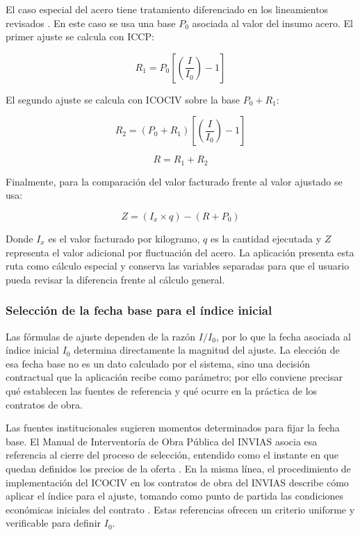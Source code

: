 \documentclass[12pt,letterpaper]{article}
\providecommand{\parencite}{\citep}
\newcommand{\ICOCIV}{ICOCIV}
\newcommand{\ICCP}{ICCP}
\newcommand{\INVIAS}{INVIAS}
\begin{document}
El caso especial del acero tiene tratamiento diferenciado en los lineamientos revisados \parencite{idu_circular_6_2022}. En este caso se usa una base \(P_0\) asociada al valor del insumo acero. El primer ajuste se calcula con \ICCP:

\begin{equation}
\label{eq:r1_acero}
R_1 = P_0 \left[ \left( \frac{I}{I_0} \right) - 1 \right]
\end{equation}

El segundo ajuste se calcula con \ICOCIV{} sobre la base \(P_0 + R_1\):

\begin{equation}
\label{eq:r2_acero}
R_2 = (P_0 + R_1) \left[ \left( \frac{I}{I_0} \right) - 1 \right]
\end{equation}

\begin{equation}
\label{eq:r_acero}
R = R_1 + R_2
\end{equation}

Finalmente, para la comparación del valor facturado frente al valor ajustado se usa:

\begin{equation}
\label{eq:z_acero}
Z = (I_x \times q) - (R + P_0)
\end{equation}

Donde \(I_x\) es el valor facturado por kilogramo, \(q\) es la cantidad ejecutada y \(Z\) representa el valor adicional por fluctuación del acero. La aplicación presenta esta ruta como cálculo especial y conserva las variables separadas para que el usuario pueda revisar la diferencia frente al cálculo general.

\subsubsection{Selección de la fecha base para el índice inicial}
\label{sec:seleccion_i0}

Las fórmulas de ajuste dependen de la razón \(I/I_0\), por lo que la fecha asociada al índice inicial \(I_0\) determina directamente la magnitud del ajuste. La elección de esa fecha base no es un dato calculado por el sistema, sino una decisión contractual que la aplicación recibe como parámetro; por ello conviene precisar qué establecen las fuentes de referencia y qué ocurre en la práctica de los contratos de obra.

Las fuentes institucionales sugieren momentos determinados para fijar la fecha base. El Manual de Interventoría de Obra Pública del \INVIAS{} asocia esa referencia al cierre del proceso de selección, entendido como el instante en que quedan definidos los precios de la oferta \parencite{invias2010_interventoria}. En la misma línea, el procedimiento de implementación del \ICOCIV{} en los contratos de obra del \INVIAS{} describe cómo aplicar el índice para el ajuste, tomando como punto de partida las condiciones económicas iniciales del contrato \parencite{invias2022_icociv}. Estas referencias ofrecen un criterio uniforme y verificable para definir \(I_0\).
\end{document}
